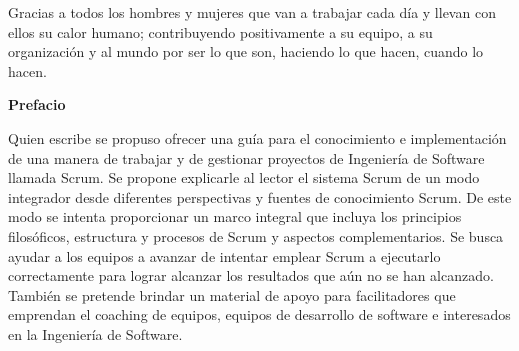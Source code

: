 
%

\newpage

\hspace{1cm}\newline %
\vspace{5cm} %

\begin{center}
Gracias a todos los hombres y mujeres que van a trabajar cada día y llevan con ellos su calor humano; contribuyendo positivamente a su equipo, a su organización y al mundo por ser lo que son, haciendo lo que hacen, cuando lo hacen.
\end{center}

\newpage
\vspace{2cm} %
\hspace{1cm}\newline %

%

\newpage

{\large \textbf{Prefacio}}

\vspace{2cm} %

Quien escribe se propuso ofrecer una guía para el conocimiento e implementación de una manera de trabajar y de gestionar proyectos de Ingeniería de Software llamada Scrum. Se propone explicarle al lector el sistema Scrum de un modo integrador desde diferentes perspectivas y fuentes de conocimiento Scrum. De este modo se intenta proporcionar un marco integral que incluya los principios filosóficos, estructura y procesos de Scrum y aspectos complementarios. Se busca ayudar a los equipos a avanzar de intentar emplear Scrum a ejecutarlo correctamente para lograr alcanzar los resultados que aún no se han alcanzado. También se pretende brindar un material de apoyo para facilitadores que emprendan el coaching de equipos, equipos de desarrollo de software e interesados en la Ingeniería de Software.

\newpage
\vspace{2cm} %
\hspace{1cm}\newline %
 
